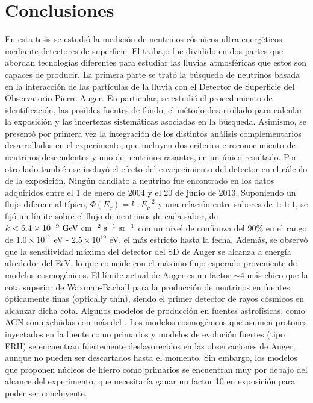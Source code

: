 \chapter{Conclusiones}
\label{ch:concl}

En esta tesis se estudi\'o la medici\'on de neutrinos c\'osmicos ultra energ\'eticos mediante detectores de superficie. 
El trabajo fue dividido en dos partes que abordan tecnolog\'ias diferentes para estudiar las lluvias atmosf\'ericas que estos son capaces de producir.
La primera parte se trat\'o la b\'usqueda de neutrinos basada en la interacci\'on de las part\'iculas de la lluvia con el Detector de Superficie del Observatorio Pierre Auger.
En particular, se estudi\'o el procedimiento de identificaci\'on, las posibles fuentes de fondo, el m\'etodo desarrollado para calcular la exposici\'on y las incertezas sistem\'aticas asociadas en la b\'usqueda.
Asimismo, se present\'o por primera vez la integraci\'on de los distintos an\'alisis complementarios desarrollados en el experimento, que incluyen dos criterios e reconocimiento de neutrinos descendentes y uno de neutrinos rasantes, en un \'unico resultado.
Por otro lado tambi\'en se incluy\'o el efecto del envejecimiento del detector en el c\'alculo de la exposici\'on.
Ning\'un candiato a neutrino fue encontrado en los datos adquiridos entre el 1 de enero de 2004 y el 20 de junio de 2013. 
Suponiendo un flujo diferencial t\'ipico, $\Phi(E_\nu)= k\cdot E^{-2}_\nu$ y una relaci\'on entre sabores de $1 : 1 : 1$, se fij\'o un l\'imite sobre el flujo de neutrinos de cada sabor, de $k < 6.4 \times 10^{-9}~{\rm GeV~cm^{-2}~s^{-1}~sr^{-1}}$ con un nivel de confianza del 90\% en el rango de ${1.0 \times 10^{17}}$ {eV} - ${2.5 \times 10^{19}}$ {eV}, el m\'as estricto hasta la fecha.
Adem\'as, se observ\'o que la sensitividad m\'axima del detector del SD de Auger se alcanza a energ\'ia alrededor del EeV, lo que coincide con el m\'aximo flujo esperado proveniente de modelos cosmog\'enicos.
El l\'imite actual de Auger es un factor $\sim4$ m\'as chico que la cota superior de Waxman-Bachall para la producci\'on de neutrinos en fuentes \'opticamente finas (optically thin), siendo el primer detector de rayos c\'osmicos en alcanzar dicha cota.
Algunos modelos de producci\'on en fuentes astrof\'isicas, como AGN son excluidas con m\'as del .
Los modelos cosmog\'enicos que asumen protones inyectados en la fuente como primarios y modelos de evoluci\'on fuertes (tipo FRII) se encuentran fuertemente desfavorecidos en las observaciones de Auger, aunque no pueden ser descartados hasta el momento.
Sin embargo, los modelos que proponen n\'ucleos de hierro como primarios se encuentran muy por debajo del alcance del experimento, que necesitar\'ia ganar un factor 10 en exposici\'on para poder ser concluyente.

